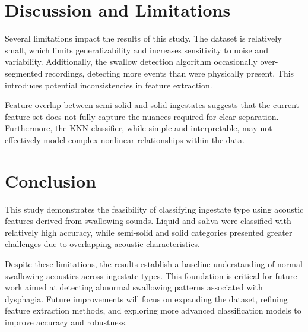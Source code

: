 \documentclass[conference]{IEEEtran}
\begin{document}
\section{Discussion and Limitations}

Several limitations impact the results of this study. The dataset is relatively small, which limits generalizability and increases sensitivity to noise and variability. Additionally, the swallow detection algorithm occasionally over-segmented recordings, detecting more events than were physically present. This introduces potential inconsistencies in feature extraction.

Feature overlap between semi-solid and solid ingestates suggests that the current feature set does not fully capture the nuances required for clear separation. Furthermore, the KNN classifier, while simple and interpretable, may not effectively model complex nonlinear relationships within the data.

\section{Conclusion}

This study demonstrates the feasibility of classifying ingestate type using acoustic features derived from swallowing sounds. Liquid and saliva were classified with relatively high accuracy, while semi-solid and solid categories presented greater challenges due to overlapping acoustic characteristics.

Despite these limitations, the results establish a baseline understanding of normal swallowing acoustics across ingestate types. This foundation is critical for future work aimed at detecting abnormal swallowing patterns associated with dysphagia. Future improvements will focus on expanding the dataset, refining feature extraction methods, and exploring more advanced classification models to improve accuracy and robustness.
\end{document}
